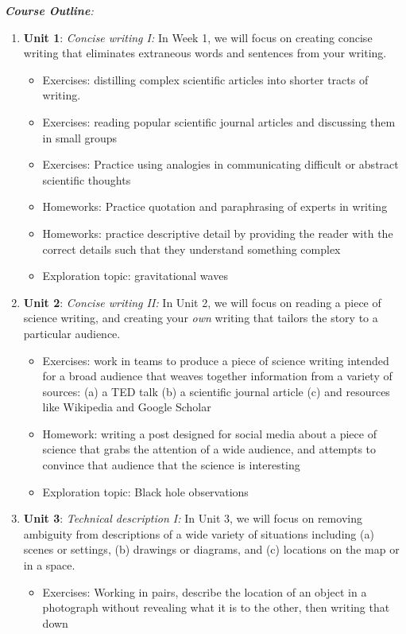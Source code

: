 \documentclass[10pt]{article}
\begin{document}
\textit{\textbf{Course Outline}:}
\begin{enumerate}
\item \textbf{Unit 1}: \textit{Concise writing I:} In Week 1, we will focus on creating concise writing that eliminates extraneous words and sentences from your writing.
\begin{itemize}
\item Exercises: distilling complex scientific articles into shorter tracts of writing.
\item Exercises: reading popular scientific journal articles and discussing them in small groups
\item Exercises: Practice using analogies in communicating difficult or abstract scientific thoughts
\item Homeworks: Practice quotation and paraphrasing of experts in writing
\item Homeworks: practice descriptive detail by providing the reader with the correct details such that they understand something complex
\item Exploration topic: gravitational waves
\end{itemize}
\item \textbf{Unit 2}: \textit{Concise writing II:} In Unit 2, we will focus on reading a piece of science writing, and creating your \textit{own} writing that tailors the story to a particular audience.
\begin{itemize}
\item Exercises: work in teams to produce a piece of science writing intended for a broad audience that weaves together information from a variety of sources: (a) a TED talk (b) a scientific journal article (c) and resources like Wikipedia and Google Scholar
\item Homework: writing a post designed for social media about a piece of science that grabs the attention of a wide audience, and attempts to convince that audience that the science is interesting
\item Exploration topic: Black hole observations
\end{itemize}
\item \textbf{Unit 3}: \textit{Technical description I:} In Unit 3, we will focus on removing ambiguity from descriptions of a wide variety of situations including (a) scenes or settings, (b) drawings or diagrams, and (c) locations on the map or in a space.
\begin{itemize}
\item Exercises: Working in pairs, describe the location of an object in a photograph without revealing what it is to the other, then writing that down

\end{itemize}
\end{enumerate}
\end{document}
